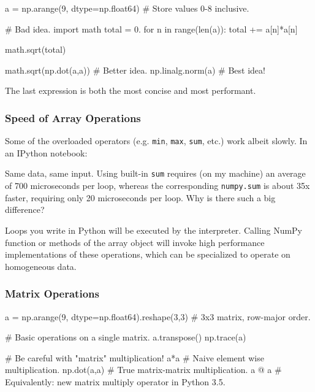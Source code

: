 \documentclass[12pt,letterpaper,twoside]{article}
\begin{document}
\begin{python}
a = np.arange(9, dtype=np.float64)   # Store values 0-8 inclusive.

# Bad idea.
import math
total = 0.
for n in range(len(a)):
    total += a[n]*a[n]

math.sqrt(total)

math.sqrt(np.dot(a,a))  # Better idea.
np.linalg.norm(a)       # Best idea!
\end{python}

The last expression is both the most concise and most performant.

\subsubsection{Speed of Array Operations}

Some of the overloaded operators (e.g. \texttt{min}, \texttt{max},
\texttt{sum}, etc.) work albeit slowly.
In an IPython notebook:
\begin{python}
\end{python}

Same data, same input. Using built-in \texttt{sum} requires (on my
machine) an average of 700 microseconds per loop, whereas the
corresponding \texttt{numpy.sum} is about 35x faster, requiring only
20 microseconds per loop. Why is there such a big difference?

Loops you write in Python will be executed by the interpreter.
Calling NumPy function or methods of the array object will invoke high
performance implementations of these operations, which can be
specialized to operate on homogeneous data.

\subsubsection{Matrix Operations}

\begin{python}
a = np.arange(9, dtype=np.float64).reshape(3,3)  # 3x3 matrix, row-major order.

# Basic operations on a single matrix.
a.transpose()
np.trace(a)

# Be careful with "matrix" multiplication!
a*a           # Naive element wise multiplication.
np.dot(a,a)   # True matrix-matrix multiplication.
a @ a         # Equivalently: new matrix multiply operator in Python 3.5.
\end{python}
\end{document}
